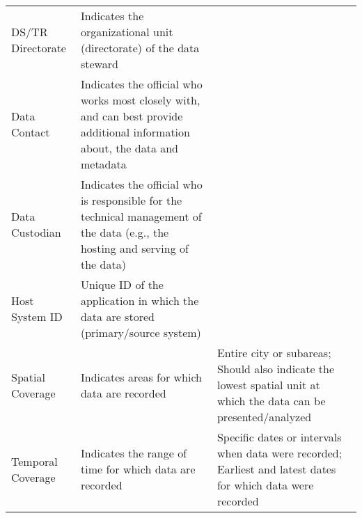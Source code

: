 \begin{table}
\begin{tabulary}{\ourtablewidth}{lLL}
DS/TR Directorate & Indicates the organizational unit (directorate) of the data steward & \\
Data Contact & Indicates the official who works most closely with, and can best provide additional information about, the data and metadata & \\
Data Custodian & Indicates the official who is responsible for the technical management of the data (e.g., the hosting and serving of the data) & \\
Host System ID & Unique ID of the application in which the data are stored (primary/source system) & \\
\addlinespace
Spatial Coverage & Indicates areas for which data are recorded & Entire city or subareas; Should also indicate the lowest spatial unit at which the data can be presented/analyzed\\
Temporal Coverage & Indicates the range of time for which data are recorded & Specific dates or intervals when data were recorded; Earliest and latest dates for which data were recorded\\
\bottomrule
\end{tabulary}
\end{table}